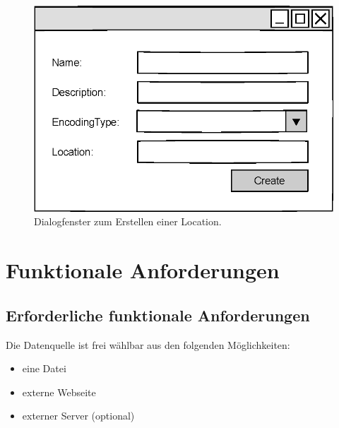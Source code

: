 \documentclass[a4paper, 12 pt]{article}
\begin{document}
\begin{figure}[htbp]
\centering
\includegraphics[scale=1]{images/loc}
\caption{\label{fig:loc}Dialogfenster zum Erstellen einer Location.}
\end{figure}

\newpage
\section{Funktionale Anforderungen}
\subsection{Erforderliche funktionale Anforderungen}
	
	Die Datenquelle ist frei wählbar aus den folgenden Möglichkeiten:
		\begin{itemize}
			\item eine Datei
			\item externe Webseite
			\item externer Server (optional)
		\end{itemize}
		
	
\end{document}
